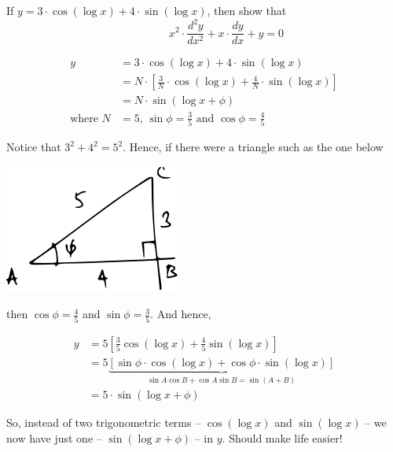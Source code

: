\documentclass[14pt,fleqn]{extarticle}
\begin{document}
\newcommand\sine{\sin \left( \log x + \phi \right) }
\newcommand\cosine{\cos \left( \log x + \phi \right)}
\newcommand\scos{\cos \left(\log x \right) }
\newcommand\ssin{\sin \left(\log x \right) }

If $y = 3\cdot \cos \left(\log x \right) + 4\cdot \sin \left(\log x \right)$, then show 
that \[ \qquad \qquad x^2\cdot \frac{d^2 y}{dx^2} + x\cdot \frac{dy}{dx} + y = 0 \]
%

\newcard 

\begin{align}
	y &= 3\cdot \cos \left(\log x \right) + 4\cdot \sin \left(\log x \right) \\ 
	&= N\cdot \left[\frac{3}{N} \cdot \cos \left(\log x \right) + \frac{4}{N}\cdot \sin \left(\log x \right) \right] \\
	&= N\cdot \sine  \\
	\text{where } N &= 5,\,\sin\phi = \frac{3}{5}\text{ and } \cos\phi = \frac{4}{5}
\end{align}

\newcard 

Notice that $3^2 + 4^2 = 5^2$. Hence, if there were a triangle such as the one below 

\begin{center} 
\includegraphics[scale=1.7]{figure.svg} 
\end{center} 

then $\cos\phi = \frac{4}{5}$ and $\sin\phi = \frac{3}{5}$. And hence, 

\begin{align}
	y &= 5 \left[\frac{3}{5}\scos  + \frac{4}{5} \ssin \right] \\
	&= 5 \underbrace{\left[\sin\phi \cdot \scos + \cos\phi\cdot \ssin \right]}_{\sin A\cos B + \cos A\sin B = \sin \left(A+B \right)} \\
	&= 5 \cdot \sine 
\end{align}

So, instead of two trigonometric terms -- $\scos$ and $\ssin$ -- we now have just one -- $\sine$ -- in $y$. Should make life easier! 
\end{document}
